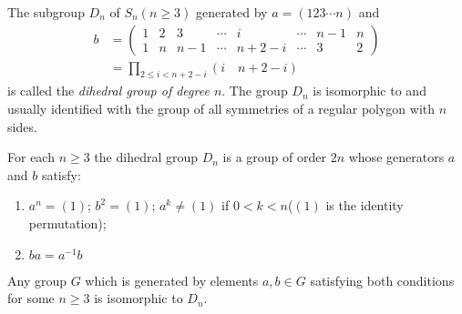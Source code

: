 \begin{Definition}
	The subgroup $ D_n $ of $ S_n (n \geqslant 3)$ generated by $ a=(123\cdots n) $ and
	\begin{align}
		b&= \begin{pmatrix}
		1 & 2 & 3 & \cdots & i &\cdots & n-1 & n \\
		1 & n & n-1 & \cdots & n+2-i & \cdots &  3  & 2
		\end{pmatrix} \nonumber\\
	&= \prod_{2\leqslant i < n+2-i} (i \quad n+2-i) \nonumber
	\end{align}
is called the \textit{dihedral group of degree $ n $}. The group $ D_n $ is isomorphic to and usually identified with the group of all symmetries of a regular polygon with $ n $ sides.
\end{Definition}
\begin{Theorem}
	For each $ n \geqslant 3 $ the dihedral group $ D_n $ is a group of order $ 2n $ whose generators $ a $ and $ b $ satisfy:
	\begin{enumerate}
		\item $ a^n=(1) $; $ b^2=(1)$; $ a^k\neq (1) $ if $ 0<k<n $($ (1) $ is the identity permutation);
		\item $ ba = a^{-1}b $
	\end{enumerate}
Any group $ G $ which is generated by elements $ a,b \in G $ satisfying both conditions for some $ n \geqslant 3 $ is isomorphic to $ D_n $.
\end{Theorem}


